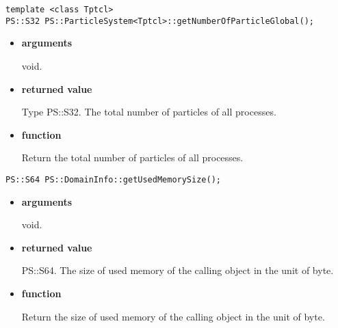 
\begin{screen}
\begin{verbatim}
template <class Tptcl>
PS::S32 PS::ParticleSystem<Tptcl>::getNumberOfParticleGlobal();
\end{verbatim}
\end{screen}

\begin{itemize}

\item {\bf arguments}

void.

\item {\bf returned value}

Type PS::S32. The total number of particles of all processes.


\item {\bf function}

Return the total number of particles of all processes.


\end{itemize}

\begin{screen}
\begin{verbatim}
PS::S64 PS::DomainInfo::getUsedMemorySize();
\end{verbatim}
\end{screen}

\begin{itemize}

\item {\bf arguments}

void.

\item {\bf returned value}

PS::S64. The size of used memory of the calling object in the unit of byte.

\item {\bf function}

Return the size of used memory of the calling object in the unit of byte.

\end{itemize}

